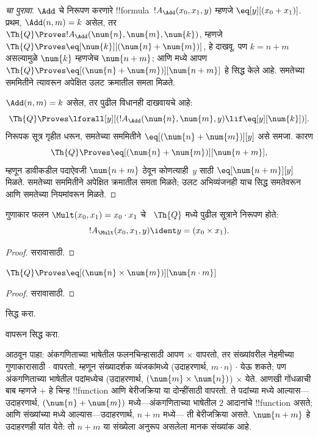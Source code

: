 \documentclass[../../../include/open-logic-section]{subfiles}
\begin{document}
\begin{proof}[ चा पुरावा]
$\Add$ चे निरूपण करणारे !!{formula}~$!A_\Add(x_0, x_1, y)$
म्हणजे $\eq[y][(x_0 + x_1)]$. प्रथम, $\Add(n, m) = k$
असेल, तर $\Th{Q} \Proves !A_\Add(\num{n}, \num{m}, \num{k})$,
म्हणजे $\Th{Q}
\Proves \eq[\num{k}][(\num{n} + \num{m})]$, हे दाखवू.
पण $k = n + m$ असल्यामुळे $\num{k}$ म्हणजेच $\num{n+m}$;
आणि  मध्ये आपण
$\Th{Q} \Proves \eq[(\num{n} +
  \num{m})][\num{n+m}]$ हे सिद्ध केले आहे. समतेच्या
सममितीने त्यावरून अपेक्षित उलट क्रमातील समता मिळते.

$\Add(n, m) = k$ असेल, तर पुढील विधानही दाखवायचे आहे:
\[
\Th{Q} \Proves \lforall[y][(!A_\Add(\num{n}, \num{m}, y) \lif
  \eq[y][\num{k}])].
\]
निरूपक सूत्र गृहीत धरून, समतेच्या सममितीने
$\eq[(\num{n} + \num{m})][y]$ असे समजा. कारण
\[
\Th{Q} \Proves \eq[(\num{n}+\num{m})][\num{n+m}],
\]
म्हणून डावीकडील पदाऐवजी $\num{n+m}$ ठेवून कोणत्याही~$y$
साठी $\eq[\num{n+m}][y]$ मिळते. समतेच्या सममितीने
अपेक्षित क्रमातील समता मिळते; उलट अभिव्यंजनही याच सिद्ध
समतेवरून आणि समतेच्या नियमांवरून मिळते.
\end{proof}

\begin{prop}
गुणाकार फलन $\Mult(x_0, x_1) = x_0 \cdot x_1$ चे
~$\Th{Q}$ मध्ये पुढील सूत्राने निरूपण होते:
\[
  !A_{\Mult}(x_0, x_1, y) \ident y = (x_0 \times x_1).
\]
\end{prop}

\begin{proof} सरावासाठी. \end{proof}

\begin{lem}
$\Th{Q} \Proves \eq[(\num{n} \times \num{m})][\num{n \cdot m}]$
\end{lem}

\begin{proof} सरावासाठी. \end{proof}

\begin{prob}
 सिद्ध करा.
\end{prob}

\begin{prob}
 वापरून
 सिद्ध करा.
\end{prob}

\begin{explain}
  आठवून पाहा: अंकगणिताच्या भाषेतील फलनचिन्हासाठी आपण $\times$
  वापरतो, तर संख्यांवरील नेहमीच्या गुणाकारासाठी $\cdot$ वापरतो.
  म्हणून संख्यादर्शक व्यंजकांमध्ये (उदाहरणार्थ, $m \cdot n$)
  $\cdot$ येऊ शकते; पण अंकगणिताच्या भाषेतील पदांमध्येच
  (उदाहरणार्थ, $(\num{m} \times
  \num{n})$) $\times$ येते. आणखी गोंधळाची बाब म्हणजे $+$
  हे चिन्ह !!{function} आणि बेरीजक्रिया या दोन्हींसाठी वापरतो.
  ते पदांच्या मध्ये आल्यास---उदाहरणार्थ, $(\num{n} + \num{m})$
  मध्ये---अंकगणिताच्या भाषेतील $2$ आदानांचे !!{function} असते;
  आणि संख्यांच्या मध्ये आल्यास---उदाहरणार्थ, $n+m$ मध्ये---
  ती बेरीजक्रिया असते. $\num{n+m}$ हे उदाहरणही यांत येते:
  तो $n+m$ या संख्येला अनुरूप असलेला मानक संख्यांक आहे.
\end{explain}
\end{document}
